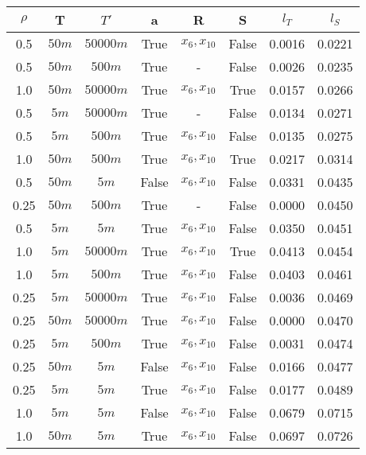 \begin{tabular}{| c c c | c c c | c c |}
\hline
$\rho{}$ & T & $T'$ & a & R & S & $l_T$ & $l_S$ \\
\hline
0.5 & $50m$ & $50000m$ & True & $x_{6}, x_{10}$ & False & 0.0016 & 0.0221 \\
0.5 & $50m$ & $500m$ & True & - & False & 0.0026 & 0.0235 \\
1.0 & $50m$ & $50000m$ & True & $x_{6}, x_{10}$ & True & 0.0157 & 0.0266 \\
0.5 & $5m$ & $50000m$ & True & - & False & 0.0134 & 0.0271 \\
0.5 & $5m$ & $500m$ & True & $x_{6}, x_{10}$ & False & 0.0135 & 0.0275 \\
1.0 & $50m$ & $500m$ & True & $x_{6}, x_{10}$ & True & 0.0217 & 0.0314 \\
0.5 & $50m$ & $5m$ & False & $x_{6}, x_{10}$ & False & 0.0331 & 0.0435 \\
0.25 & $50m$ & $500m$ & True & - & False & 0.0000 & 0.0450 \\
0.5 & $5m$ & $5m$ & True & $x_{6}, x_{10}$ & False & 0.0350 & 0.0451 \\
1.0 & $5m$ & $50000m$ & True & $x_{6}, x_{10}$ & True & 0.0413 & 0.0454 \\
1.0 & $5m$ & $500m$ & True & $x_{6}, x_{10}$ & False & 0.0403 & 0.0461 \\
0.25 & $5m$ & $50000m$ & True & $x_{6}, x_{10}$ & False & 0.0036 & 0.0469 \\
0.25 & $50m$ & $50000m$ & True & $x_{6}, x_{10}$ & False & 0.0000 & 0.0470 \\
0.25 & $5m$ & $500m$ & True & $x_{6}, x_{10}$ & False & 0.0031 & 0.0474 \\
0.25 & $50m$ & $5m$ & False & $x_{6}, x_{10}$ & False & 0.0166 & 0.0477 \\
0.25 & $5m$ & $5m$ & True & $x_{6}, x_{10}$ & False & 0.0177 & 0.0489 \\
1.0 & $5m$ & $5m$ & False & $x_{6}, x_{10}$ & False & 0.0679 & 0.0715 \\
1.0 & $50m$ & $5m$ & True & $x_{6}, x_{10}$ & False & 0.0697 & 0.0726 \\
\hline
\end{tabular}
